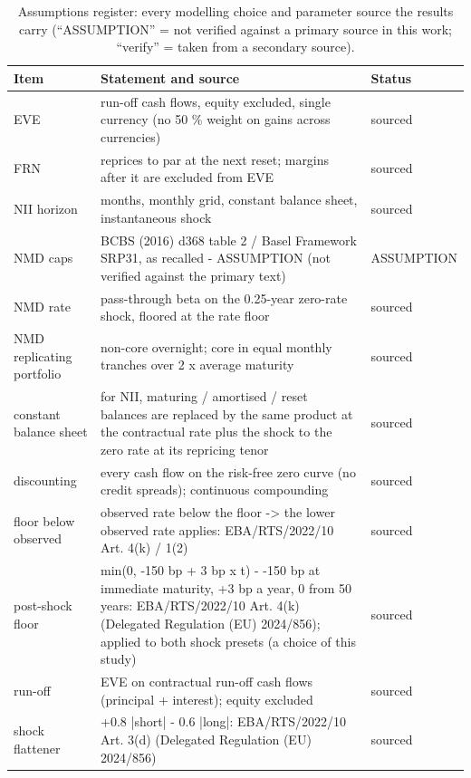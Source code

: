 \begin{table}[H]
\centering
\scriptsize
\caption{Assumptions register: every modelling choice and parameter source the results carry (``ASSUMPTION'' = not verified against a primary source in this work; ``verify'' = taken from a secondary source).}
\label{tab:R3_assumptions}
\setlength{\tabcolsep}{3pt}
\begin{tabular}{>{\raggedright\arraybackslash}p{3.0cm}>{\raggedright\arraybackslash}p{10.6cm}>{\raggedright\arraybackslash}p{2.1cm}}
\toprule
Item & Statement and source & Status \\
\midrule
EVE & run-off cash flows, equity excluded, single currency (no 50 \% weight on gains across currencies) & sourced \\
FRN & reprices to par at the next reset; margins after it are excluded from EVE & sourced \\
NII horizon & 12 months, monthly grid, constant balance sheet, instantaneous shock & sourced \\
NMD caps & BCBS (2016) d368 table 2 / Basel Framework SRP31, as recalled - ASSUMPTION (not verified against the primary text) & ASSUMPTION \\
NMD rate & pass-through beta on the 0.25-year zero-rate shock, floored at the rate floor & sourced \\
NMD replicating portfolio & non-core overnight; core in equal monthly tranches over 2 x average maturity & sourced \\
constant balance sheet & for NII, maturing / amortised / reset balances are replaced by the same product at the contractual rate plus the shock to the zero rate at its repricing tenor & sourced \\
discounting & every cash flow on the risk-free zero curve (no credit spreads); continuous compounding & sourced \\
floor below observed & observed rate below the floor -> the lower observed rate applies: EBA/RTS/2022/10 Art. 4(k) / 1(2) & sourced \\
post-shock floor & min(0, -150 bp + 3 bp x t) - -150 bp at immediate maturity, +3 bp a year, 0 from 50 years: EBA/RTS/2022/10 Art. 4(k) (Delegated Regulation (EU) 2024/856); applied to both shock presets (a choice of this study) & sourced \\
run-off & EVE on contractual run-off cash flows (principal + interest); equity excluded & sourced \\
shock flattener & +0.8 |short| - 0.6 |long|: EBA/RTS/2022/10 Art. 3(d) (Delegated Regulation (EU) 2024/856) & sourced \\

\end{tabular}
\end{table}
